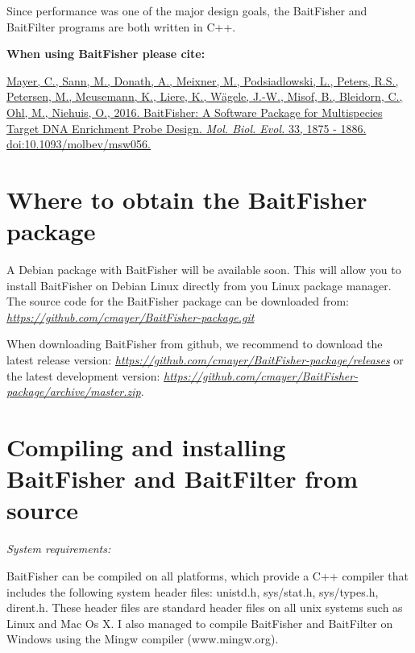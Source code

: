 \documentclass[a4paper,pdflatex,11pt]{article}
\begin{document}
Since performance was one of the major design goals, the BaitFisher and
BaitFilter programs are both written in C++.

\textbf{When using BaitFisher please cite:}

\href{https://academic.oup.com/mbe/article/33/7/1875/2579186/BaitFisher-A-Software-Package-for-Multispecies}
{Mayer, C., Sann, M., Donath, A., Meixner, M., Podsiadlowski, L., Peters,
R.S., Petersen, M., Meusemann, K., Liere, K., Wägele, J.-W., Misof, B.,
Bleidorn, C., Ohl, M., Niehuis, O., 2016. BaitFisher: A Software Package for
Multispecies Target DNA Enrichment Probe Design. \emph{Mol. Biol. Evol.} 33, 1875 - 1886.
doi:10.1093/molbev/msw056.}

\section{Where to obtain the BaitFisher package}

A Debian package with BaitFisher will be available soon. This will allow you to install BaitFisher
on Debian Linux directly from you Linux package manager.\\

The source code for the BaitFisher package can be downloaded from:\\
\href{https://github.com/cmayer/BaitFisher-package.git}
{\emph{https://github.com/cmayer/BaitFisher-package.git}}

When downloading BaitFisher from github, we recommend to download the latest release version:
\href{https://github.com/cmayer/BaitFisher-package/releases}
{\emph{https://github.com/cmayer/BaitFisher-package/releases}}
or the latest development version:
\href{https://github.com/cmayer/BaitFisher-package/archive/master.zip}
{\emph{https://github.com/cmayer/BaitFisher-package/archive/master.zip}}.


\section{Compiling and installing BaitFisher and BaitFilter from source}

\emph{System requirements:}

BaitFisher can be compiled on all platforms, which provide a C++
compiler that includes the following system header files: unistd.h,
sys/stat.h, sys/types.h, dirent.h. These header files are standard
header files on all unix systems such as Linux and Mac Os X. I also
managed to compile BaitFisher and BaitFilter on Windows using the Mingw
compiler (www.mingw.org).
\end{document}
